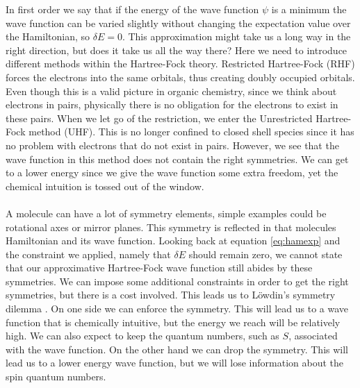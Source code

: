 \documentclass[twoside,twocolumn,9pt]{article}
\begin{document}
In first order we say that if the energy of the wave function $\psi$ is a minimum the wave function can be varied slightly without changing the expectation value over the
Hamiltonian, so $\delta E = 0$.
This approximation might take us a long way in the right direction, but does it take us all the way there? Here we need to introduce different methods within the
Hartree-Fock theory. Restricted Hartree-Fock (RHF) forces the electrons into the same orbitals, thus creating doubly occupied orbitals. Even though this is a valid picture
in organic chemistry, since we think about electrons in pairs, physically there is no obligation for the electrons to exist in these pairs.
When we let go of the restriction, we enter the Unrestricted Hartree-Fock method (UHF). This  is no longer confined to closed shell species since it has no problem with
electrons that do not exist in pairs. However, we see that the wave function in this method does not contain the right symmetries. We can get to a lower energy since we give
the wave function some extra freedom, yet the chemical intuition is tossed out of the window.
\paragraph*{}
A molecule can have a lot of symmetry elements, simple examples could be rotational axes or mirror planes. This symmetry is reflected in that molecules Hamiltonian and its wave
function.
Looking back at equation \eqref{eq:hamexp} and
the constraint we applied, namely that $\delta E$ should remain zero, we cannot state that our approximative Hartree-Fock wave function still abides by these symmetries.
We can impose some additional constraints in order to get the right symmetries, but there is a cost involved. This leads us to Löwdin's symmetry dilemma \cite{Lowdin1963}.
On one side we can enforce the symmetry. This will lead us to a wave function that is chemically intuitive, but the energy we reach will be relatively high. We can also expect to
keep the quantum numbers, such as $S$, associated with the wave function. On the other hand we can drop the symmetry. This will lead us to a lower energy wave function, but we will
lose information about the spin quantum numbers.
\end{document}
